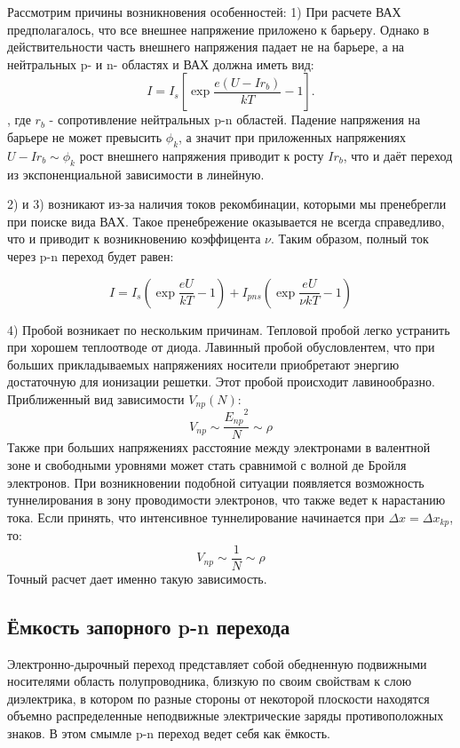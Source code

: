 \documentclass[a4paper]{article}
\begin{document}
    Рассмотрим причины возникновения особенностей:
    1) 	При расчете ВАХ предполагалось, что все внешнее напряжение приложено к барьеру. Однако в действительности часть внешнего напряжения падает не на барьере, а на нейтральных p- и n- областях и ВАХ должна иметь вид:
    \begin{equation}
        I=I_s [\exp{\frac{e (U-I r_b)}{kT}} - 1].
    \end{equation},
    где $r_b$ - сопротивление нейтральных p-n областей. Падение напряжения на барьере не может превысить $\phi_{k}$, а значит при приложенных напряжениях $U-Ir_b \sim \phi_{k}$ рост внешнего напряжения приводит к росту $Ir_b$, что и даёт переход из экспоненциальной зависимости в линейную.
    
    2) и 3) возникают из-за наличия токов рекомбинации, которыми мы пренебрегли при поиске вида ВАХ. Такое пренебрежение оказывается не всегда справедливо, что и приводит к возникновению коэффицента $\nu$. Таким образом, полный ток через p-n переход будет равен:
    
    \begin{equation}
        I = I_s (\exp{\frac{eU}{kT}} - 1) + I_{pns} (\exp{\frac{eU}{\nu kT}} - 1)
    \end{equation}
    
    4) Пробой возникает по нескольким причинам. Тепловой пробой легко устранить при хорошем теплоотводе от диода. Лавинный пробой обусловлентем, что при больших прикладываемых напряжениях носители приобретают энергию достаточную для ионизации решетки. Этот пробой происходит лавинообразно. Приближенный вид зависимости $V_{np}(N)$:
    \begin{equation}
        V_{np} \sim \frac{{E_{np}}^2}{N} \sim \rho
    \end{equation}
    Также при больших напряжениях расстояние между электронами в валентной зоне и свободными уровнями может стать сравнимой с волной де Бройля электронов. При возникновении подобной ситуации появляется возможность туннелирования в зону проводимости электронов, что также ведет к нарастанию тока. Если принять, что интенсивное туннелирование начинается при $\Delta x = \Delta x_{kp} $, то:
    \begin{equation}
        V_{np} \sim \frac{1}{N} \sim \rho
    \end{equation}
    Точный расчет дает именно такую зависимость.
    
    \subsection{Ёмкость запорного p-n перехода}
    Электронно-дырочный переход представляет собой обедненную подвижными носителями область полупроводника, близкую по своим свойствам к слою диэлектрика, в котором по разные стороны от некоторой плоскости находятся объемно распределенные неподвижные электрические заряды противоположных знаков. В этом смымле p-n переход ведет себя как ёмкость.
    
\end{document}
